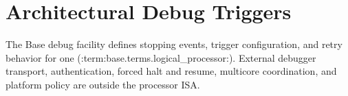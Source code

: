 \clearpage
\section{Architectural Debug Triggers}\label{page:architectural-debug}

The Base debug facility defines stopping events, trigger configuration, and retry behavior for one
(:term:base.terms.logical_processor:). External debugger transport, authentication, forced halt and resume,
multicore coordination, and platform policy are outside the processor ISA.
